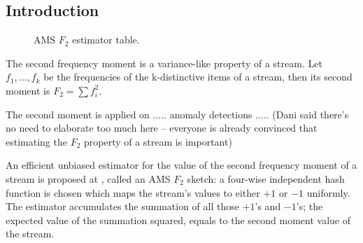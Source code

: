 \documentclass[11pt, conference]{IEEEtran}
\begin{document}


	\subsection{Introduction}

\begin{figure}[!b]
	\caption{\label{fig:my-label} AMS $F_2$ estimator table.}
\end{figure}	
	
The second frequency moment is a variance-like property of a stream. Let $f_1,...,f_k$ be the frequencies of the k-distinctive items of a stream, then its second moment is $F_2 = {\sum{f_i ^2}}$.

The second moment is applied on ..... anomaly detections ..... (Dani said there's no need to elaborate too much here -- everyone is already convinced that estimating the $F_2$ property of a stream is important)

An efficient unbiased estimator for the value of the second frequency moment of a stream is proposed at \cite{alon1999space}, called an AMS $F_2$ sketch: a four-wise independent hash function is chosen which maps the stream's values to either $+1$ or $-1$ uniformly. The estimator accumulates the summation of all those $+1$'s and $-1$'s; the expected value of the summation squared, equals to the second moment value of the stream.
\end{document}
